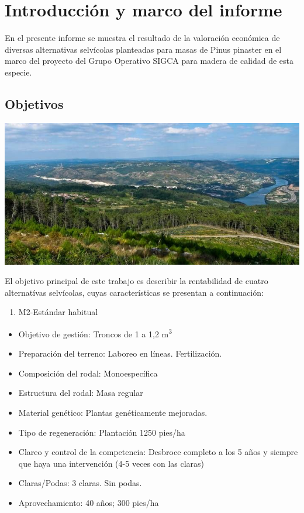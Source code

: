 \documentclass[]{article}
\author{}
\date{\vspace{-2.5em}}
\providecommand{\tightlist}{%
  \setlength{\itemsep}{0pt}\setlength{\parskip}{0pt}}
\begin{document}

\tableofcontents

\section{Introducción y marco del
informe}\label{introducciuxf3n-y-marco-del-informe}

En el presente informe se muestra el resultado de la valoración
económica de diversas alternativas selvícolas planteadas para masas de
Pinus pinaster en el marco del proyecto del Grupo Operativo SIGCA para
madera de calidad de esta especie.

\subsection{Objetivos}\label{objetivos}

\begin{center}\includegraphics[width=750px]{./imagenes/pinares_92f650725ebb0a7b902f15aebd658059} \end{center}

El objetivo principal de este trabajo es describir la rentabilidad de
cuatro alternatívas selvícolas, cuyas características se presentan a
continuación:

\begin{enumerate}
\def\labelenumi{\arabic{enumi}.}
\tightlist
\item
  M2-Estándar habitual
\end{enumerate}

\begin{itemize}
\tightlist
\item
  Objetivo de gestión: Troncos de 1 a 1,2 m\textsuperscript{3}
\item
  Preparación del terreno: Laboreo en líneas. Fertilización.
\item
  Composición del rodal: Monoespecífica
\item
  Estructura del rodal: Masa regular
\item
  Material genético: Plantas genéticamente mejoradas.
\item
  Tipo de regeneración: Plantación 1250 pies/ha
\item
  Clareo y control de la competencia: Desbroce completo a los 5 años y
  siempre que haya una intervención (4-5 veces con las claras)
\item
  Claras/Podas: 3 claras. Sin podas.
\item
  Aprovechamiento: 40 años; 300 pies/ha
\end{itemize}
\end{document}

